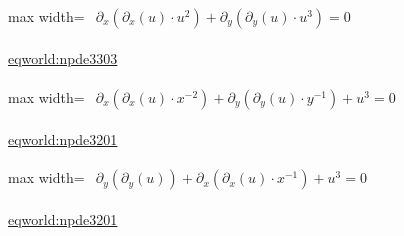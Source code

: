 \documentclass[UTF8,10pt,a4paper,fontset=mac]{ctexart}
\begin{document}
\begin{minipage}{\linewidth}\begin{center}\begin{adjustbox}{max width=\linewidth}$\displaystyle\begin{gathered}\begin{gathered}\partial_{x}(\partial_{x}(u)\cdot u^{2})+\partial_{y}(\partial_{y}(u)\cdot u^{3})=0\end{gathered}\end{gathered}$\end{adjustbox}\end{center}{\small\href{https://eqworld.ipmnet.ru/en/solutions/npde/npde3303.pdf}{eqworld:npde3303}}\par\end{minipage}\par\vspace{6mm}

\begin{minipage}{\linewidth}\begin{center}\begin{adjustbox}{max width=\linewidth}$\displaystyle\begin{gathered}\begin{gathered}\partial_{x}(\partial_{x}(u)\cdot x^{-2})+\partial_{y}(\partial_{y}(u)\cdot y^{-1})+u^{3}=0\end{gathered}\end{gathered}$\end{adjustbox}\end{center}{\small\href{https://eqworld.ipmnet.ru/en/solutions/npde/npde3201.pdf}{eqworld:npde3201}}\par\end{minipage}\par\vspace{6mm}

\begin{minipage}{\linewidth}\begin{center}\begin{adjustbox}{max width=\linewidth}$\displaystyle\begin{gathered}\begin{gathered}\partial_{y}(\partial_{y}(u))+\partial_{x}(\partial_{x}(u)\cdot x^{-1})+u^{3}=0\end{gathered}\end{gathered}$\end{adjustbox}\end{center}{\small\href{https://eqworld.ipmnet.ru/en/solutions/npde/npde3201.pdf}{eqworld:npde3201}}\par\end{minipage}\par\vspace{6mm}
\end{document}
